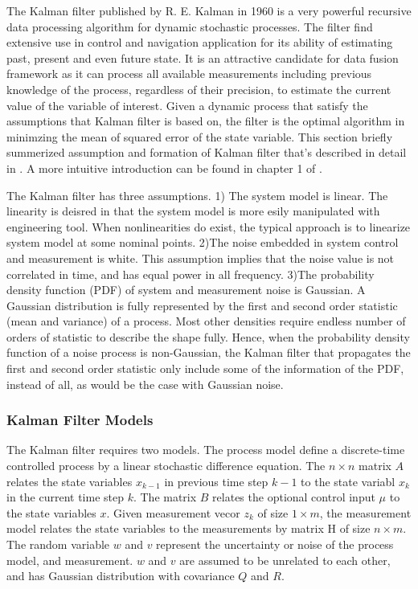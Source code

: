 The Kalman filter \cite{kalman_new_1960}published by R. E. Kalman in
1960 is a very powerful recursive data processing algorithm for
dynamic stochastic processes. The filter find extensive use in control
and navigation application for its ability of estimating past, present
and even future state. It is an attractive candidate for data fusion
framework as it can process all available measurements including
previous knowledge of the process, regardless of their precision, to
estimate the current value of the variable of interest. Given a
dynamic process that satisfy the assumptions that Kalman filter is
based on, the filter is the optimal algorithm in minimzing the mean of
squared error of the state variable. This section briefly summerized
assumption and formation of Kalman filter that's described in detail
in \cite{sorenson_least-squares_1970}
\cite{analytic_sciences_corporation_applied_1974}
\cite{grewal_kalman_1993} \cite{lewis_optimal_1986}
\cite{brown_introduction_1993}. A more intuitive introduction can be
found in chapter 1 of \cite{maybeck_stochastic_1979}.

The Kalman filter has three assumptions. 1) The system model is
linear. The linearity is deisred in that the system model is more
esily manipulated with engineering tool. When nonlinearities do exist,
the typical approach is to linearize system model at some nominal
points. 2)The noise embedded in system control and measurement is
white. This assumption implies that the noise value is not correlated
in time, and has equal power in all frequency. 3)The probability
density function (PDF) of system and measurement noise is Gaussian. A
Gaussian distribution is fully represented by the first and second
order statistic (mean and variance) of a process. Most other densities
require endless number of orders of statistic to describe the shape
fully. Hence, when the probability density function of a noise process
is non-Gaussian, the Kalman filter that propagates the first and
second order statistic only include some of the information of the
PDF, instead of all, as would be the case with Gaussian noise.

\subsubsection{Kalman Filter Models}
The Kalman filter requires two models. The process model define a
discrete-time controlled process by a linear stochastic difference
equation. The $n\times n$ matrix $A$ relates the state variables
$x_{k-1}$ in previous time step $k-1$ to the state variabl $x_{k}$ in
the current time step $k$. The matrix $B$ relates the optional control
input $\mu$ to the state variables $x$. Given measurement vecor $z_k$
of size $1 \times m$, the measurement model relates the state
variables to the measurements by matrix H of size $n \times m$. The
random variable $w$ and $v$ represent the uncertainty or noise of the
process model, and measurement. $w$ and $v$ are assumed to be
unrelated to each other, and has Gaussian distribution with covariance
$Q$ and $R$. 

